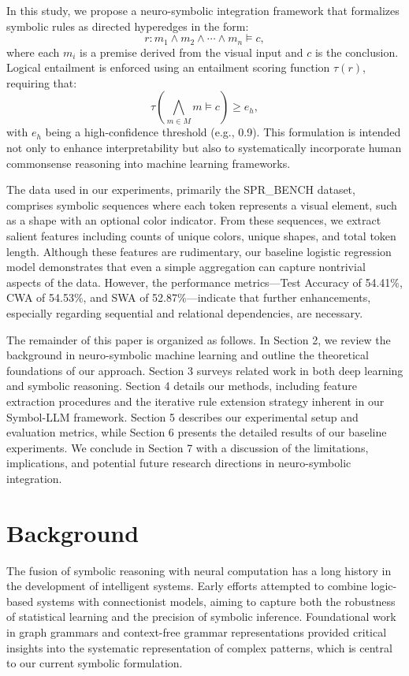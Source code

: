 \documentclass[11pt]{article}
\begin{document}
In this study, we propose a neuro-symbolic integration framework that formalizes symbolic rules as directed hyperedges in the form:
\[
r: m_1 \wedge m_2 \wedge \cdots \wedge m_n \models c,
\]
where each \(m_i\) is a premise derived from the visual input and \(c\) is the conclusion. Logical entailment is enforced using an entailment scoring function \(\tau(r)\), requiring that:
\[
\tau\left(\bigwedge_{m \in M} m \models c\right) \geq e_h,
\]
with \(e_h\) being a high-confidence threshold (e.g., 0.9). This formulation is intended not only to enhance interpretability but also to systematically incorporate human commonsense reasoning into machine learning frameworks.

The data used in our experiments, primarily the SPR\_BENCH dataset, comprises symbolic sequences where each token represents a visual element, such as a shape with an optional color indicator. From these sequences, we extract salient features including counts of unique colors, unique shapes, and total token length. Although these features are rudimentary, our baseline logistic regression model demonstrates that even a simple aggregation can capture nontrivial aspects of the data. However, the performance metrics—Test Accuracy of 54.41\%, CWA of 54.53\%, and SWA of 52.87\%—indicate that further enhancements, especially regarding sequential and relational dependencies, are necessary.

The remainder of this paper is organized as follows. In Section 2, we review the background in neuro-symbolic machine learning and outline the theoretical foundations of our approach. Section 3 surveys related work in both deep learning and symbolic reasoning. Section 4 details our methods, including feature extraction procedures and the iterative rule extension strategy inherent in our Symbol-LLM framework. Section 5 describes our experimental setup and evaluation metrics, while Section 6 presents the detailed results of our baseline experiments. We conclude in Section 7 with a discussion of the limitations, implications, and potential future research directions in neuro-symbolic integration.

\section{Background}
The fusion of symbolic reasoning with neural computation has a long history in the development of intelligent systems. Early efforts attempted to combine logic-based systems with connectionist models, aiming to capture both the robustness of statistical learning and the precision of symbolic inference. Foundational work in graph grammars and context-free grammar representations provided critical insights into the systematic representation of complex patterns, which is central to our current symbolic formulation.
\end{document}
